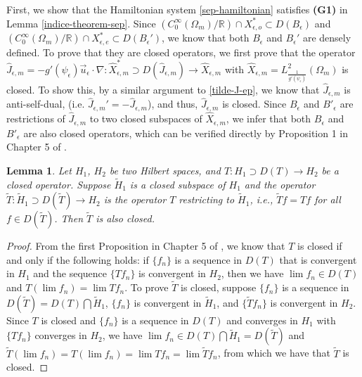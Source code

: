 \documentclass[1 [leqno, 11pt]{amsart}
\numberwithin{equation}{section}
\let\ep=\epsilon
\newtheorem{lemma}[Theorem]{Lemma}
\begin{document}
\begin{CJK*}{GBK}{song}

First, we show that  the Hamiltonian system \eqref{sep-hamiltonian} satisfies {\textbf{(G1)}} in Lemma \ref{indice-theorem-sep}.
Since  $(C_0^\infty(\Omega_m)/\mathbb{R})\cap X_{\ep, o}^*\subset D( B_\ep)$ and $(C_0^\infty(\Omega_m)/\mathbb{R})\cap X_{\ep, e}^*\subset D( B_\ep')$, we know that both $B_\ep$ and $B_\ep'$ are densely defined. To prove that they are closed operators, we first prove that the operator $\hat{J}_{\ep,m} = -g'(\psi_\ep) \vec{u}_\ep \cdot \nabla : \hat{X}_{\ep,m}^* \supset D(\hat{J}_{\ep,m}) \rightarrow \hat{X}_{\ep,m}$ with $\hat{X}_{\ep,m} = L^2_{\frac{1}{g'(\psi_\ep)}}(\Omega_m)$ is closed. To show this, by a similar argument to \eqref{tilde-J-ep}, we know that
$\hat{J}_{\ep,m}$
is anti-self-dual, (i.e. $\hat{J}_{\ep,m}'= -\hat{J}_{\ep,m}$), and thus, $\hat{J}_{\ep,m}$ is closed. Since $B_\ep$ and $B'_\ep$ are restrictions of  $\hat{J}_{\ep,m}$  to two closed subspaces of $\hat{X}_{\ep,m}$, we infer that  both $B_\ep$ and $B'_\ep$ are also closed operators, which can be verified directly by  Proposition 1 in Chapter 5 of \cite{Weidmann80}.
\begin{lemma}\label{closed-operator}
Let $H_1$, $H_2$ be two Hilbert spaces, and $T: H_1 \supset D(T) \rightarrow H_2$ be a closed operator. Suppose $\tilde{H}_1$ is a closed subspace of $H_1$ and the operator $\tilde{T} : \tilde{H}_1 \supset D(\tilde{T}) \rightarrow H_2$ is the operator $T$ restricting to $\tilde{H}_1$, i.e., $\tilde{T}f = Tf$ for all $f \in D(\tilde{T})$. Then $\tilde{T}$ is also closed.
\end{lemma}
\begin{proof}
From the first Proposition in Chapter 5 of \cite{weidmann2012linear}, we know that $T$ is closed if and only if the following holds: if $\{f_n\}$ is a sequence in $D(T)$ that is convergent in $H_1$ and the sequence $\{Tf_n\}$ is convergent in $H_2$, then we have $\lim f_n \in D(T)$ and $T(\lim f_n) = \lim Tf_n$. To prove $\tilde{T}$ is closed, suppose $\{f_n\}$ is a sequence in $D(\tilde{T}) = D(T) \bigcap \tilde{H}_1$, $\{f_n\}$ is convergent in $\tilde{H}_1$,  and $\{\tilde{T}f_n\}$ is convergent in $H_2$. Since $T$ is closed and $\{f_n\}$ is a sequence in $D(T)$ and converges in $H_1$ with $\{Tf_n\}$ converges in $H_2$, we have $\lim f_n \in D(T) \bigcap \tilde{H}_1 = D(\tilde{T})$ and $\tilde{T}(\lim f_n) = T(\lim f_n) = \lim T f_n = \lim \tilde{T} f_n$, from which we have that $\tilde{T}$ is closed.
\end{proof}
\fi


\end{CJK*}
\end{document}
